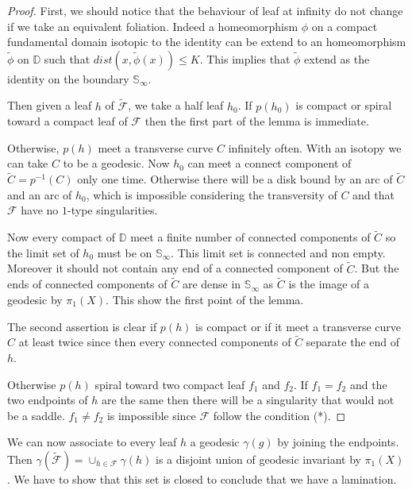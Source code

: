 \begin{proof}
First, we should notice that the behaviour of leaf at infinity do not change if we take an equivalent foliation. Indeed a homeomorphism $\phi$ on a compact fundamental domain isotopic to the identity can be extend to an homeomorphism $\tilde{\phi}$ on $\mathbb{D}$ such that $dist(x,\tilde{\phi}(x)) \leq K$. This implies that $\tilde{\phi}$ extend as the identity on the boundary $\mathbb{S}_{\infty}$.

\smallbreak
Then given a leaf $h$ of $\mathcal{\tilde{F}}$, we take a half leaf $h_0$. If $p(h_0)$ is compact or spiral toward a compact leaf of $\mathcal{F}$ then the first part of the lemma is immediate.

\smallbreak
Otherwise, $p(h)$ meet a transverse curve $C$ infinitely often. With an isotopy we can take $C$ to be a geodesic. Now $h_0$ can meet a connect component of $\tilde{C}=p^{-1}(C)$ only one time. Otherwise there will be a disk bound by an arc of $\tilde{C}$ and an arc of $h_0$, which is impossible considering the transversity of $C$ and that $\mathcal{F}$ have no $1$-type singularities.

\smallbreak
Now every compact of $\mathbb{D}$ meet a finite number of connected components of $\tilde{C}$ so the limit set of $h_0$ must be on $\mathbb{S}_{\infty}$. This limit set is connected and non empty. Moreover it should not contain any end of a connected component of $\tilde{C}$. But the ends of connected components of $\tilde{C}$ are dense in $\mathbb{S}_{\infty}$ as $\tilde{C}$ is the image of a geodesic by $\pi_1(X)$. This show the first point of the lemma.

\smallbreak
The second assertion is clear if $p(h)$ is compact or if it meet a transverse curve $C$ at least twice since then every connected components of $\tilde{C}$ separate the end of $h$.

\smallbreak
Otherwise $p(h)$ spiral toward two compact leaf $f_1$ and $f_2$. If $f_1=f_2$ and the two endpoints of $h$ are the same then there will be a singularity that would not be a saddle. $f_1 \neq f_2$ is impossible since $\mathcal{F}$ follow the condition (*).
\end{proof}

\smallbreak
We can now associate to every leaf $h$ a geodesic $\gamma(g)$ by joining the endpoints. Then $\gamma(\tilde{\mathcal{F}})= \cup_{h \in \mathcal{F}} \gamma(h)$ is a disjoint union of geodesic invariant by $\pi_1(X)$. We have to show that this set is closed to conclude that we have a lamination.

